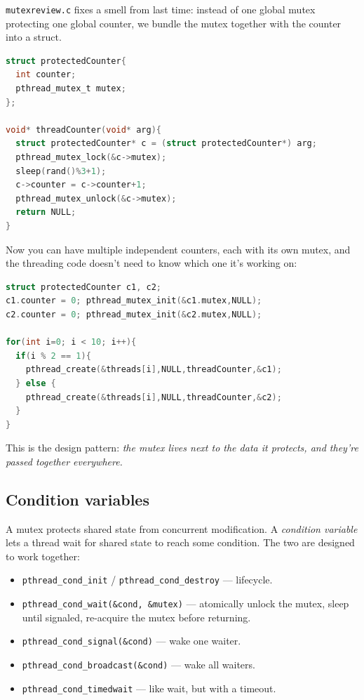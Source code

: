 \documentclass[11pt]{article}
\begin{document}
\texttt{mutexreview.c} fixes a smell from last time: instead of one
global mutex protecting one global counter, we bundle the mutex
together with the counter into a struct.

\begin{lstlisting}[language=C]
struct protectedCounter{
  int counter;
  pthread_mutex_t mutex;
};

void* threadCounter(void* arg){
  struct protectedCounter* c = (struct protectedCounter*) arg;
  pthread_mutex_lock(&c->mutex);
  sleep(rand()%3+1);
  c->counter = c->counter+1;
  pthread_mutex_unlock(&c->mutex);
  return NULL;
}
\end{lstlisting}

Now you can have multiple independent counters, each with its own
mutex, and the threading code doesn't need to know which one it's
working on:

\begin{lstlisting}[language=C]
struct protectedCounter c1, c2;
c1.counter = 0; pthread_mutex_init(&c1.mutex,NULL);
c2.counter = 0; pthread_mutex_init(&c2.mutex,NULL);

for(int i=0; i < 10; i++){
  if(i % 2 == 1){
    pthread_create(&threads[i],NULL,threadCounter,&c1);
  } else {
    pthread_create(&threads[i],NULL,threadCounter,&c2);
  }
}
\end{lstlisting}

This is the design pattern: \emph{the mutex lives next to the data
it protects, and they're passed together everywhere.}

\subsection*{Condition variables}

A mutex protects shared state from concurrent modification. A
\emph{condition variable} lets a thread wait for shared state to
reach some condition. The two are designed to work together:

\begin{itemize}
  \item \texttt{pthread\_cond\_init} / \texttt{pthread\_cond\_destroy}
    --- lifecycle.
  \item \texttt{pthread\_cond\_wait(\&cond, \&mutex)} --- atomically
    unlock the mutex, sleep until signaled, re-acquire the mutex
    before returning.
  \item \texttt{pthread\_cond\_signal(\&cond)} --- wake one waiter.
  \item \texttt{pthread\_cond\_broadcast(\&cond)} --- wake all
    waiters.
  \item \texttt{pthread\_cond\_timedwait} --- like wait, but with a
    timeout.
\end{itemize}
\end{document}
